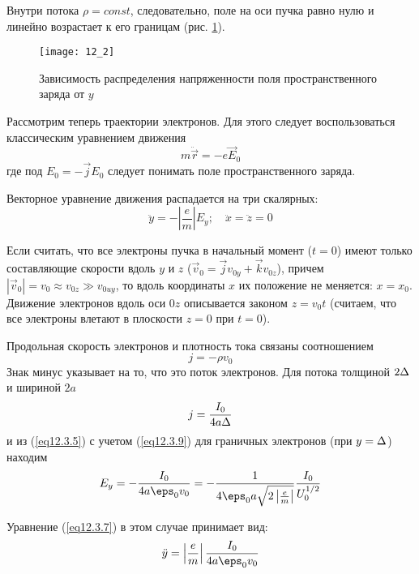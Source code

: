 Внутри потока \( \rho = const \), следовательно, поле на оси пучка равно нулю 
и линейно возрастает к его границам (рис. \ref{img12.2}).

\begin{figure}[h!]
	\center
	\texttt{[image: 12\_2]}
	\caption{Зависимость распределения напряженности поля пространственного
		заряда от \( y \)}
	\label{img12.2}
\end{figure}
 
Рассмотрим теперь траектории электронов. Для этого следует воспользоваться 
классическим уравнением движения
\begin{equation}
	m\ddot{\vec{r}} = -e\vec{E}_0
	\label{eq12.3.6}
\end{equation}
где под \( E_0 = -\vec{j}E_0 \) следует понимать поле пространственного 
заряда. 

Векторное уравнение движения распадается на три скалярных:
\begin{equation}
	\ddot{y} = -\left| \frac{e}{m} \right|E_y; \quad
	\ddot{x} = \ddot{z} = 0
	\label{eq12.3.7}
\end{equation}

Если считать, что все электроны пучка в начальный момент (\( t = 0\)) имеют 
только составляющие  скорости вдоль \( y \) и \( z \) 
(\( \vec{v}_0 = \vec{j}v_{0y} + \vec{k}v_{0z} \)), причем 
\( |\vec{v}_0| = v_0 \approx v_{0z} \gg v_{0uy} \), то вдоль координаты 
\( x \) их положение не меняется: \( x = x_0 \). Движение электронов вдоль оси 
\( 0z \) описывается законом \( z = v_0 t \) (считаем, что все электроны 
влетают в плоскости \( z = 0 \) при \( t = 0 \)).

Продольная скорость электронов и плотность тока связаны соотношением
\begin{equation}
	j = -\rho v_0
	\label{eq12.3.8}
\end{equation}
Знак минус указывает на то, что это поток электронов. Для потока толщиной 
\( 2\Delta \) и шириной \( 2a \)
\begin{equation}
	j = \frac{I_0}{4a\Delta}
	\label{eq12.3.9}
\end{equation}
и из (\ref{eq12.3.5}) с учетом (\ref{eq12.3.9}) для граничных электронов (при 
\( y = \Delta \)) находим
\begin{equation}
	E_y = -\frac{I_0}{4a\eps_0 v_0} = 
		-\frac{1}{4\eps_0 a \sqrt{2\left|\frac{e}{m}\right|}}
		\frac{I_0}{U_0^{1/2}}
	\label{eq12.3.10}
\end{equation}

Уравнение (\ref{eq12.3.7}) в этом случае принимает вид:
\begin{equation}
	\ddot{y} = \left| \frac{e}{m} \right| \frac{I_0}{4a\eps_0 v_0}
	\label{eq12.3.11}
\end{equation}

